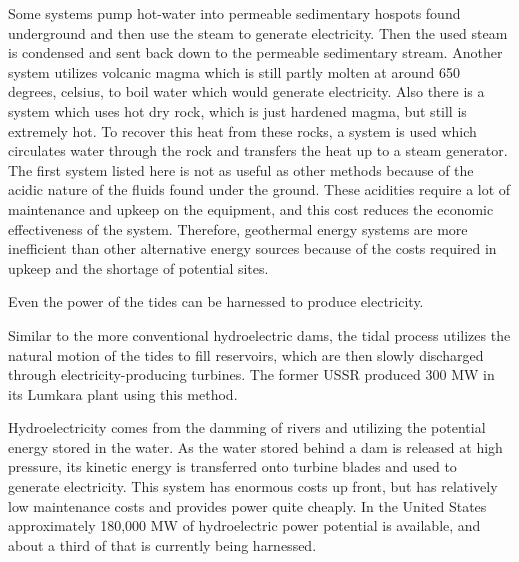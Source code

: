 \documentclass[a4paper]{article}
\begin{document}
Some systems pump hot-water into permeable sedimentary hospots found underground and then use the steam
to generate electricity. Then the used steam is condensed and sent back down to the permeable
sedimentary stream. Another system utilizes volcanic magma which is still partly molten at around
650 degrees, celsius, to boil water which would generate electricity. Also there is a system which
uses hot dry rock, which is just hardened magma, but still is extremely hot. To recover this heat
from these rocks, a system is used which circulates water through the rock and transfers the heat
up to a steam generator. The first system listed here is not as useful as other methods because of
the acidic nature of the fluids found under the ground. These acidities require a lot of maintenance
and upkeep on the equipment, and this cost reduces the economic effectiveness of the system.
Therefore, geothermal energy systems are more inefficient than other alternative energy sources because
of the costs required in upkeep and the shortage of potential sites.

Even the power of the tides can be harnessed to produce electricity.

Similar to the more conventional hydroelectric dams, the tidal process utilizes the natural motion
of the tides to fill reservoirs, which are then slowly discharged through electricity-producing turbines.
The former USSR produced 300 MW in its Lumkara plant using this method.

Hydroelectricity comes from the damming of rivers and utilizing the potential energy stored in the water.
As the water stored behind a dam is released at high pressure, its kinetic energy is transferred onto
turbine blades and used to generate electricity. This system has enormous costs up front, but has
relatively low maintenance costs and provides power quite cheaply. In the United States approximately
180,000 MW of hydroelectric power potential is available, and about a third of that is currently
being harnessed.
\end{document}

